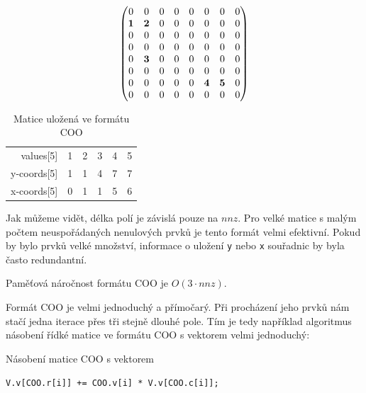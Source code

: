 \begin{align}
\begin{pmatrix}
	0 & 0 & 0 & 0 & 0 & 0 & 0 & 0 \\
	\boldsymbol{1} & \boldsymbol{2} & 0 & 0 & 0 & 0 & 0 & 0 \\
	0 & 0 & 0 & 0 & 0 & 0 & 0 & 0 \\
	0 & 0 & 0 & 0 & 0 & 0 & 0 & 0 \\
	0 & \boldsymbol{3} & 0 & 0 & 0 & 0 & 0 & 0 \\
	0 & 0 & 0 & 0 & 0 & 0 & 0 & 0 \\
	0 & 0 & 0 & 0 & 0 & \boldsymbol{4} & \boldsymbol{5} & 0 \\
	0 & 0 & 0 & 0 & 0 & 0 & 0 & 0 \\	
\end{pmatrix} \notag
\end{align}

\begin{table}[htb]
    \begin{tabular}{r|lllll}
    values[5]   & 1 & 2 & 3 & 4 & 5 \\
    y-coords[5] & 1 & 1 & 4 & 7 & 7 \\
    x-coords[5] & 0 & 1 & 1 & 5 & 6 \\
    \end{tabular}
    \caption{Matice uložená ve formátu COO}
\end{table}

Jak můžeme vidět, délka polí je závislá pouze na $nnz$. Pro velké matice s malým počtem neuspořádaných nenulových prvků je tento formát velmi efektivní. Pokud by bylo prvků velké množství, informace o uložení \texttt{y} nebo \texttt{x} souřadnic by byla často redundantní.

Paměťová náročnost formátu COO je $O(3 \cdot nnz)$.

Formát COO je velmi jednoduchý a přímočarý. Při procházení jeho prvků nám stačí jedna iterace přes tři stejně dlouhé pole. Tím je tedy například algoritmus násobení řídké matice ve formátu COO s vektorem velmi jednoduchý:

\begin{algorithm}[htb]
	\caption{Násobení matice COO s vektorem}\label{coo-mvm}
	\begin{algorithmic}[1]
			\State \texttt{V.v[COO.r[i]] += COO.v[i] * V.v[COO.c[i]];	}
		\EndFor
		\EndProcedure
	\end{algorithmic}
\end{algorithm}

